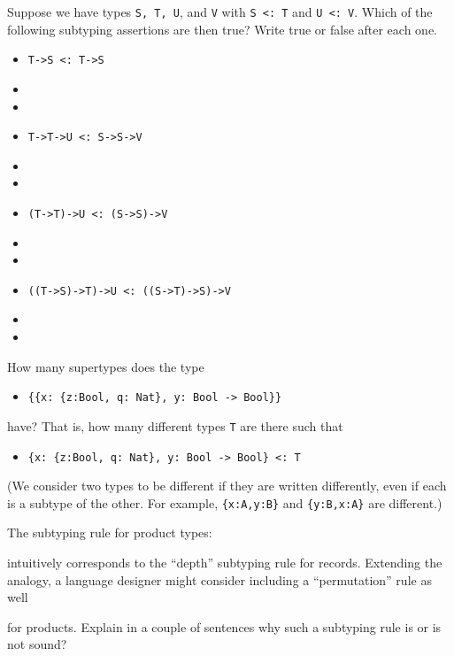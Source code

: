 \documentclass[12pt]{article}
\newenvironment{problem}[2][Problem]{\begin{trivlist}
\item[\hskip \labelsep {\bfseries #1}\hskip \labelsep {\bfseries #2.}]}{\end{trivlist}}
\begin{document}
\begin{problem}{3 (2 points)}
  Suppose we have types \lstinline|S, T, U|, and \lstinline|V| with
  \lstinline|S <: T| and \lstinline|U <: V|.  Which of the following
  subtyping assertions are then true? Write true or false after each
  one.

  \begin{itemize}
  \item \lstinline|T->S <: T->S|
  \item[ ]
  \item[ ]

  \item \lstinline|T->T->U <: S->S->V|
  \item[ ]
  \item[ ]

  \item \lstinline|(T->T)->U <: (S->S)->V|
  \item[ ]
  \item[ ]

  \item \lstinline|((T->S)->T)->U <: ((S->T)->S)->V|
  \item[ ]
  \item[ ]

  \end{itemize}

\end{problem}

\pagebreak
\begin{problem}{4 (1 point)}
  How many supertypes does the type
  \begin{itemize}
  \item [ ] \lstinline|{{x: {z:Bool, q: Nat}, y: Bool -> Bool}}|
  \end{itemize}
  have? That is, how many different types \lstinline|T| are there such
  that
  \begin{itemize}
  \item[ ] \lstinline|{x: {z:Bool, q: Nat}, y: Bool -> Bool} <: T|
  \end{itemize}
  (We consider two types to be
  different if they are written differently, even if each is a subtype
  of the other. For example, \lstinline|{x:A,y:B}| and
  \lstinline|{y:B,x:A}| are different.)
\end{problem}

\vspace{5cm}

\begin{problem}{5 (2 points)}
  The subtyping rule for product types:

  { }

\noindent intuitively corresponds to the ``depth'' subtyping rule for
  records. Extending the analogy, a language designer might consider
  including a ``permutation'' rule as well


\noindent for products. Explain in a couple of sentences why such a subtyping
  rule is or is not sound?
\end{problem}
\end{document}
